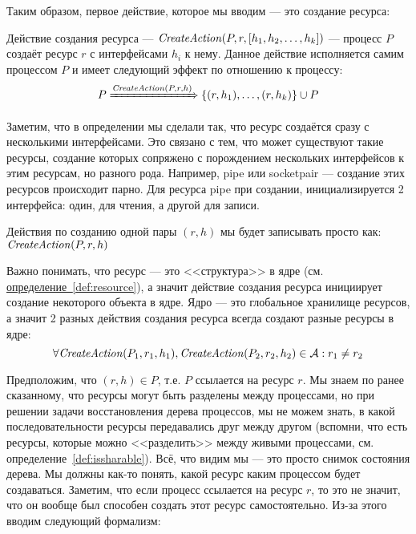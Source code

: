 Таким образом, первое действие, которое мы вводим --- это создание ресурса:

\begin{defn}
\label{def:createact}
Действие создания ресурса --- $\text{\textit{CreateAction}}(P, r, \left[ h_1, h_2, \ldots, h_k \right])$ --- процесс $P$ создаёт ресурс $r$ с интерфейсами $h_i$ к нему. Данное действие исполняется самим процессом $P$ и имеет следующий эффект по отношению к процессу:
\begin{equation*}
	P \xRightarrow{\text{\textit{CreateAction}}(P, r, h)} \left\lbrace (r, h_1), \ldots, (r, h_k) \right\rbrace \cup P
\end{equation*}
\end{defn}

\begin{note}
Заметим, что в определении мы сделали так, что ресурс создаётся сразу с несколькими интерфейсами. Это связано с тем, что может существуют такие ресурсы, создание которых сопряжено с порождением нескольких интерфейсов к этим ресурсам, но разного рода. Например, pipe или socketpair --- создание этих ресурсов происходит парно. Для ресурса pipe при создании, инициализируется 2 интерфейса: один, для чтения, а другой для записи.

Действия по созданию одной пары $(r, h)$ мы будет записывать просто как: $\text{\textit{CreateAction}}(P, r, h)$
\end{note}

\begin{note}
Важно понимать, что ресурс --- это <<структура>> в ядре (см. \hyperref[def:resource]{определение~\ref*{def:resource}}), а значит действие создания ресурса инициирует создание некоторого объекта в ядре. Ядро --- это глобальное хранилище ресурсов, а значит 2 разных действия создания ресурса всегда создают разные ресурсы в ядре:
\begin{equation*}
	\forall \text{\textit{CreateAction}}(P_1, r_1, h_1), \text{\textit{CreateAction}}(P_2, r_2, h_2) \in \mathcal{A}: r_1 \neq r_2
\end{equation*}
\end{note}

Предположим, что $(r, h) \in P$, т.е. $P$ ссылается на ресурс $r$. Мы знаем по ранее сказанному, что ресурсы могут быть разделены между процессами, но при решении задачи восстановления дерева процессов, мы не можем знать, в какой последовательности ресурсы передавались друг между другом (вспомни, что есть ресурсы, которые можно <<разделить>> между живыми процессами, см. определение~\ref{def:issharable}). Всё, что видим мы --- это просто снимок состояния дерева. Мы должны как-то понять, какой ресурс каким процессом будет создаваться. Заметим, что если процесс ссылается на ресурс $r$, то это не значит, что он вообще был способен создать этот ресурс самостоятельно. Из-за этого вводим следующий формализм:

